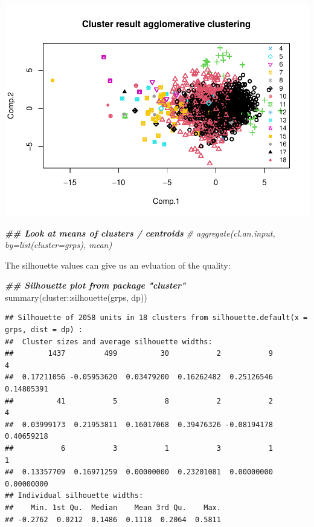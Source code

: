 \documentclass[
]{article}
\newenvironment{Shaded}{\begin{snugshade}}{\end{snugshade}}
\newcommand{\CommentTok}[1]{\textcolor[rgb]{0.56,0.35,0.01}{\textit{#1}}}
\newcommand{\DocumentationTok}[1]{\textcolor[rgb]{0.56,0.35,0.01}{\textbf{\textit{#1}}}}
\newcommand{\FunctionTok}[1]{\textcolor[rgb]{0.00,0.00,0.00}{#1}}
\newcommand{\NormalTok}[1]{#1}
\newcommand{\SpecialCharTok}[1]{\textcolor[rgb]{0.00,0.00,0.00}{#1}}
\begin{document}
\includegraphics{Influence_factors_files/figure-latex/3.03_agglo_clust_visualize_munic-1.pdf}

\begin{Shaded}
\begin{Highlighting}[]
\DocumentationTok{\#\# Look at means of clusters / centroids}
\CommentTok{\# aggregate(cl.an.input, by=list(cluster=grps), mean)}
\end{Highlighting}
\end{Shaded}

The silhouette values can give us an evluation of the quality:

\begin{Shaded}
\begin{Highlighting}[]
\DocumentationTok{\#\# Silhouette plot from package "cluster"}
\FunctionTok{summary}\NormalTok{(cluster}\SpecialCharTok{::}\FunctionTok{silhouette}\NormalTok{(grps, dp)) }
\end{Highlighting}
\end{Shaded}

\begin{verbatim}
## Silhouette of 2058 units in 18 clusters from silhouette.default(x = grps, dist = dp) :
##  Cluster sizes and average silhouette widths:
##        1437         499          30           2           9           4 
##  0.17211056 -0.05953620  0.03479200  0.16262482  0.25126546  0.14805391 
##          41           5           8           2           2           4 
##  0.03999173  0.21953811  0.16017068  0.39476326 -0.08194178  0.40659218 
##           6           3           1           3           1           1 
##  0.13357709  0.16971259  0.00000000  0.23201081  0.00000000  0.00000000 
## Individual silhouette widths:
##    Min. 1st Qu.  Median    Mean 3rd Qu.    Max. 
## -0.2762  0.0212  0.1486  0.1118  0.2064  0.5811
\end{verbatim}
\end{document}
